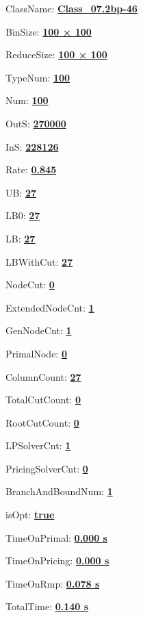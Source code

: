 \documentclass[11pt]{article}
\begin{document}
\pagestyle{empty}


ClassName: \underline{\textbf{Class_07.2bp-46}}
\par
BinSize: \underline{\textbf{100 × 100}}
\par
ReduceSize: \underline{\textbf{100 × 100}}
\par
TypeNum: \underline{\textbf{100}}
\par
Num: \underline{\textbf{100}}
\par
OutS: \underline{\textbf{270000}}
\par
InS: \underline{\textbf{228126}}
\par
Rate: \underline{\textbf{0.845}}
\par
UB: \underline{\textbf{27}}
\par
LB0: \underline{\textbf{27}}
\par
LB: \underline{\textbf{27}}
\par
LBWithCut: \underline{\textbf{27}}
\par
NodeCut: \underline{\textbf{0}}
\par
ExtendedNodeCnt: \underline{\textbf{1}}
\par
GenNodeCnt: \underline{\textbf{1}}
\par
PrimalNode: \underline{\textbf{0}}
\par
ColumnCount: \underline{\textbf{27}}
\par
TotalCutCount: \underline{\textbf{0}}
\par
RootCutCount: \underline{\textbf{0}}
\par
LPSolverCnt: \underline{\textbf{1}}
\par
PricingSolverCnt: \underline{\textbf{0}}
\par
BranchAndBoundNum: \underline{\textbf{1}}
\par
isOpt: \underline{\textbf{true}}
\par
TimeOnPrimal: \underline{\textbf{0.000 s}}
\par
TimeOnPricing: \underline{\textbf{0.000 s}}
\par
TimeOnRmp: \underline{\textbf{0.078 s}}
\par
TotalTime: \underline{\textbf{0.140 s}}
\par
\newpage


\end{document}
